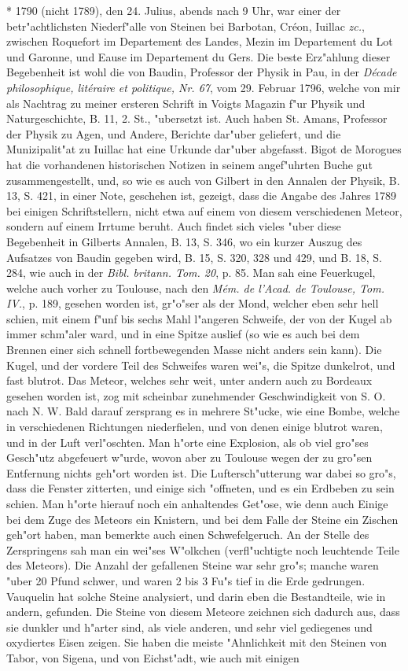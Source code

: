 \documentclass[a4paper, 11pt, oneside, polutonikogreek, german]{article}
\begin{document}
* 1790 (nicht 1789), den 24. Julius, abends nach 9 Uhr, war einer der betr"achtlichsten Niederf"alle von Steinen bei Barbotan, Créon, Iuillac \emph{zc.}, zwischen Roquefort im Departement des Landes, Mezin im Departement du Lot und Garonne, und Eause im Departement du Gers. Die beste Erz"ahlung dieser Begebenheit ist wohl die von Baudin, Professor der Physik in Pau, in der \emph{Décade philosophique, litéraire et politique, Nr. 67}, vom 29. Februar 1796, welche von mir als Nachtrag zu meiner ersteren Schrift in Voigts Magazin f"ur Physik und Naturgeschichte, B. 11, 2. St., "ubersetzt ist. Auch haben St. Amans, Professor der Physik zu Agen, und Andere, Berichte dar"uber geliefert, und die Munizipalit"at zu Iuillac hat eine Urkunde dar"uber abgefasst. Bigot de Morogues hat die vorhandenen historischen Notizen in seinem angef"uhrten Buche gut zusammengestellt, und, so wie es auch von Gilbert in den Annalen der Physik, B. 13, S. 421, in einer Note, geschehen ist, gezeigt, dass die Angabe des Jahres 1789 bei einigen Schriftstellern, nicht etwa auf einem von diesem verschiedenen Meteor, sondern auf einem Irrtume beruht. Auch findet sich vieles "uber diese Begebenheit in Gilberts Annalen, B. 13, S. 346, wo ein kurzer Auszug des Aufsatzes von Baudin gegeben wird, B. 15, S. 320, 328 und 429, und B. 18, S. 284, wie auch in der \emph{Bibl. britann. Tom. 20}, p. 85. Man sah eine Feuerkugel, welche auch vorher zu Toulouse, nach den \emph{Mém. de l'Acad. de Toulouse, Tom. IV.}, p. 189, gesehen worden ist, gr"o"ser als der Mond, welcher eben sehr hell schien, mit einem f"unf bis sechs Mahl l"angeren Schweife, der von der Kugel ab immer schm"aler ward, und in eine Spitze auslief (so wie es auch bei dem Brennen einer sich schnell fortbewegenden Masse nicht anders sein kann). Die Kugel, und der vordere Teil des Schweifes waren wei"s, die Spitze dunkelrot, und fast blutrot. Das Meteor, welches sehr weit, unter andern auch zu Bordeaux gesehen worden ist, zog mit scheinbar zunehmender Geschwindigkeit von S. O. nach N. W. Bald darauf zersprang es in mehrere St"ucke, wie eine Bombe, welche in verschiedenen Richtungen niederfielen, und von denen einige blutrot waren, und in der Luft verl"oschten. Man h"orte eine Explosion, als ob viel gro"ses Gesch"utz abgefeuert w"urde, wovon aber zu Toulouse wegen der zu gro"sen Entfernung nichts geh"ort worden ist. Die Luftersch"utterung war dabei so gro"s, dass die Fenster zitterten, und einige sich "offneten, und es ein Erdbeben zu sein schien. Man h"orte hierauf noch ein anhaltendes Get"ose, wie denn auch Einige bei dem Zuge des Meteors ein Knistern, und bei dem Falle der Steine ein Zischen geh"ort haben, man bemerkte auch einen Schwefelgeruch. An der Stelle des Zerspringens sah man ein wei"ses W"olkchen (verfl"uchtigte noch leuchtende Teile des Meteors). Die Anzahl der gefallenen Steine war sehr gro"s; manche waren "uber 20 Pfund schwer, und waren 2 bis 3 Fu"s tief in die Erde gedrungen. Vauquelin hat solche Steine analysiert, und darin eben die Bestandteile, wie in andern, gefunden. Die Steine von diesem Meteore zeichnen sich dadurch aus, dass sie dunkler und h"arter sind, als viele anderen, und sehr viel gediegenes und oxydiertes Eisen zeigen. Sie haben die meiste "Ahnlichkeit mit den Steinen von Tabor, von Sigena, und von Eichst"adt, wie auch mit einigen 
\end{document}
